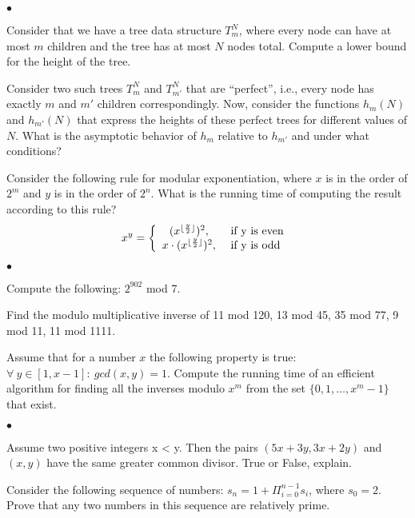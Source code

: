 \documentclass{article}
\newenvironment{myitem}{\begin{list}{$\bullet$}
{\setlength{\itemsep}{-0pt}
\setlength{\topsep}{0pt}
\setlength{\labelwidth}{0pt}
\setlength{\leftmargin}{10pt}
\setlength{\parsep}{-0pt}
\setlength{\itemsep}{0pt}
\setlength{\partopsep}{0pt}}}%
{\end{list}}
\begin{document}
\begin{myitem}
\item Consider that we have a tree data structure $T_m^N$, where every
  node can have at most $m$ children and the tree has at most $N$
  nodes total. Compute a lower bound for the height of the tree.\\

\item Consider two such trees $T_m^N$ and $T_{m'}^N$ that are
  ``perfect'', i.e., every node has exactly $m$ and $m'$ children
  correspondingly. Now, consider the functions $h_m(N)$ and
  $h_{m'}(N)$ that express the heights of these perfect trees for
  different values of $N$. What is the asymptotic behavior of $h_m$
  relative to $h_{m'}$ and under what conditions?\\

\item Consider the following rule for modular exponentiation, where
  $x$ is in the order of $2^m$ and $y$ is in the order of $2^n$. What
  is the running time of computing the result according to this rule?
$$x^y = \left\{
\begin{array}{c l}     
    (x ^{\lfloor \frac{y}{2} \rfloor} )^2,  & \textrm{ if y is even }\\
    x \cdot (x^{\lfloor \frac{y}{2} \rfloor} )^2, & \textrm{ if y is odd}
\end{array}\right.$$
\end{myitem}

\begin{myitem}
\item Compute the following: $2^{902}$ mod 7.\\
\item Find the modulo multiplicative inverse of 11 mod 120, 13 mod 45,
  35 mod 77, 9 mod 11, 11 mod 1111.\\
\item Assume that for a number $x$ the following property is true:
  $\forall\ y \in [1,x-1]:\ gcd(x,y) = 1$. Compute the running time of
  an efficient algorithm for finding all the inverses modulo $x^m$
  from the set $\{0, 1, \ldots, x^m-1\}$ that exist.\\
\end{myitem}

\begin{myitem}
\item Assume two positive integers x < y. Then the pairs
  $(5x+3y,3x+2y)$ and $(x,y)$ have the same greater common
  divisor. True or False, explain.\\

\item Consider the following sequence of numbers: $s_n = 1 +
  \Pi_{i=0}^{n-1} s_i$, where $s_0 = 2$. Prove that any two numbers in
  this sequence are relatively prime.\\
\end{myitem}
\end{document}
